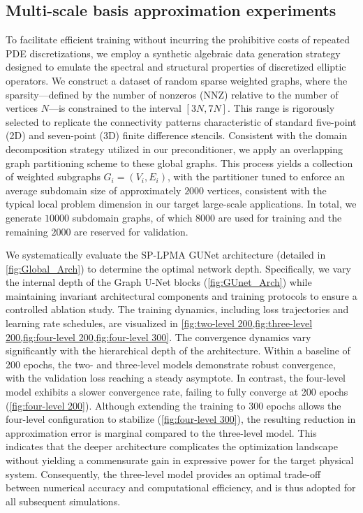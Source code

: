 \documentclass{article}
\theoremstyle{definition}
\theoremstyle{remark}
\begin{document}
\subsection{Multi-scale basis approximation experiments}
To facilitate efficient training without incurring the prohibitive costs of repeated PDE discretizations, we employ a synthetic algebraic data generation strategy designed to emulate the spectral and structural properties of discretized elliptic operators. 
We construct a dataset of random sparse weighted graphs, where the sparsity—defined by the number of nonzeros (NNZ) relative to the number of vertices $N$—is constrained to the interval $[3N, 7N]$. 
This range is rigorously selected to replicate the connectivity patterns characteristic of standard five-point (2D) and seven-point (3D) finite difference stencils.
Consistent with the domain decomposition strategy utilized in our preconditioner, we apply an overlapping graph partitioning scheme to these global graphs. 
This process yields a collection of weighted subgraphs $G_i=(V_i, E_i)$, with the partitioner tuned to enforce an average subdomain size of approximately \(2000\) vertices, consistent with the typical local problem dimension in our target large-scale applications. 
In total, we generate \(10000\) subdomain graphs, of which \(8000\) are used for training and the remaining \(2000\) are reserved for validation.


We systematically evaluate the SP-LPMA GUNet architecture (detailed in \cref{fig:Global_Arch}) to determine the optimal network depth. Specifically, we vary the internal depth of the Graph U-Net blocks (\cref{fig:GUnet_Arch}) while maintaining invariant architectural components and training protocols to ensure a controlled ablation study. The training dynamics, including loss trajectories and learning rate schedules, are visualized in \cref{fig:two-level 200,fig:three-level 200,fig:four-level 200,fig:four-level 300}. The convergence dynamics vary significantly with the hierarchical depth of the architecture. Within a baseline of 200 epochs, the two- and three-level models demonstrate robust convergence, with the validation loss reaching a steady asymptote. In contrast, the four-level model exhibits a slower convergence rate, failing to fully converge at 200 epochs (\cref{fig:four-level 200}). Although extending the training to 300 epochs allows the four-level configuration to stabilize (\cref{fig:four-level 300}), the resulting reduction in approximation error is marginal compared to the three-level model. This indicates that the deeper architecture complicates the optimization landscape without yielding a commensurate gain in expressive power for the target physical system. Consequently, the three-level model provides an optimal trade-off between numerical accuracy and computational efficiency, and is thus adopted for all subsequent simulations.
\end{document}
